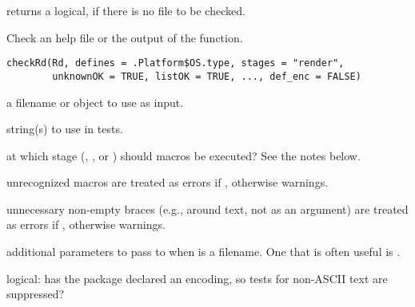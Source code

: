 %
\begin{Value}
 returns a logical,  if there is no
 file to be checked.
\end{Value}
%
\begin{SeeAlso}\relax
{}
\end{SeeAlso}
%
\begin{Description}\relax
Check an help file or the output of the  function.
\end{Description}
%
\begin{Usage}
\begin{verbatim}
checkRd(Rd, defines = .Platform$OS.type, stages = "render",
        unknownOK = TRUE, listOK = TRUE, ..., def_enc = FALSE)
\end{verbatim}
\end{Usage}
%
\begin{Arguments}
\begin{ldescription}
\item[\code{Rd}]  a filename or  object to use as input. 
\item[\code{defines}]  string(s) to use in  tests. 
\item[\code{stages}]  at which stage (, , or
) should  macros be executed? See the
notes below.
\item[\code{unknownOK}]  unrecognized macros are treated as errors if
, otherwise warnings. 
\item[\code{listOK}]  unnecessary non-empty braces (e.g., around text, not as
an argument) are treated as errors if , otherwise
warnings.
\item[\code{...}]  additional parameters to pass to  when
 is a filename.  One that is often useful is .
\item[\code{def\_enc}] logical: has the package declared an encoding, so tests
for non-ASCII text are suppressed?
\end{ldescription}
\end{Arguments}
%
